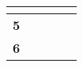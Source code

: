 \documentclass[12pt,a4paper,twoside]{article}
\begin{document}
\begin{longtable}{|>{\centering\arraybackslash}m{10cm}|>{\centering\arraybackslash}m{1.5cm}|>{\centering\arraybackslash}m{1.5cm}|>{\centering\arraybackslash}m{1.5cm}|>{\centering\arraybackslash}m{1.5cm}|}
                        
                    
                        
                            

                            
                                 & \textbf{}
                            

                        
                    
                        
                            & \cellcolor{gray!20} \textbf{}
                        
                    
                    \\ \hline
                
                    \cellcolor{gray!20} \textbf{ 5 }
                     
                        
                            

                            
                                 & \textbf{}
                            

                        
                    
                        
                            

                            
                                 & \textbf{}
                            

                        
                    
                        
                            

                            
                                 & \textbf{}
                            

                        
                    
                        
                            

                            
                                 & \textbf{}
                            

                        
                    
                    \\ \hline
                
                    \cellcolor{gray!20} \textbf{ 6 }
                     
                        
                            


\end{longtable}
\end{document}
